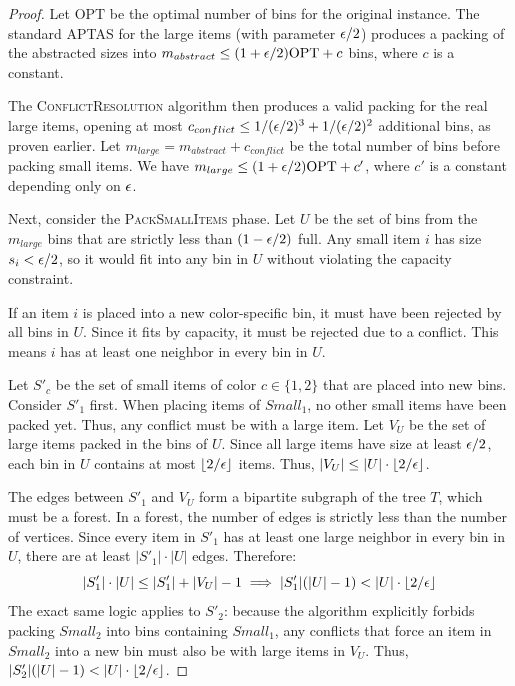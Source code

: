 \begin{proof}
Let $\text{OPT}$ be the optimal number of bins for the original instance.
The standard APTAS for the large items (with parameter $\epsilon/2$) produces a packing of the abstracted sizes into $m_{abstract} \leq (1 + \epsilon/2)\text{OPT} + c$ bins, where $c$ is a constant.

The \textsc{ConflictResolution} algorithm then produces a valid packing for the real large items, opening at most $c_{conflict} \leq 1/(\epsilon/2)^3 + 1/(\epsilon/2)^2$ additional bins, as proven earlier. Let $m_{large} = m_{abstract} + c_{conflict}$ be the total number of bins before packing small items. We have $m_{large} \leq (1 + \epsilon/2)\text{OPT} + c'$, where $c'$ is a constant depending only on $\epsilon$.

Next, consider the \textsc{PackSmallItems} phase. Let $U$ be the set of bins from the $m_{large}$ bins that are strictly less than $(1 - \epsilon/2)$ full. Any small item $i$ has size $s_i < \epsilon/2$, so it would fit into any bin in $U$ without violating the capacity constraint.

If an item $i$ is placed into a new color-specific bin, it must have been rejected by all bins in $U$. Since it fits by capacity, it must be rejected due to a conflict. This means $i$ has at least one neighbor in every bin in $U$.

Let $S'_c$ be the set of small items of color $c \in \{1, 2\}$ that are placed into new bins. Consider $S'_1$ first. When placing items of $Small_1$, no other small items have been packed yet. Thus, any conflict must be with a large item. Let $V_U$ be the set of large items packed in the bins of $U$. Since all large items have size at least $\epsilon/2$, each bin in $U$ contains at most $\lfloor 2/\epsilon \rfloor$ items. Thus, $|V_U| \leq |U| \cdot \lfloor 2/\epsilon \rfloor$.

The edges between $S'_1$ and $V_U$ form a bipartite subgraph of the tree $T$, which must be a forest. In a forest, the number of edges is strictly less than the number of vertices. Since every item in $S'_1$ has at least one large neighbor in every bin in $U$, there are at least $|S'_1| \cdot |U|$ edges. Therefore:
\[ |S'_1| \cdot |U| \leq |S'_1| + |V_U| - 1 \implies |S'_1|(|U| - 1) < |U| \cdot \lfloor 2/\epsilon \rfloor \]
The exact same logic applies to $S'_2$: because the algorithm explicitly forbids packing $Small_2$ into bins containing $Small_1$, any conflicts that force an item in $Small_2$ into a new bin must also be with large items in $V_U$. Thus, $|S'_2|(|U| - 1) < |U| \cdot \lfloor 2/\epsilon \rfloor$.


\end{proof}
